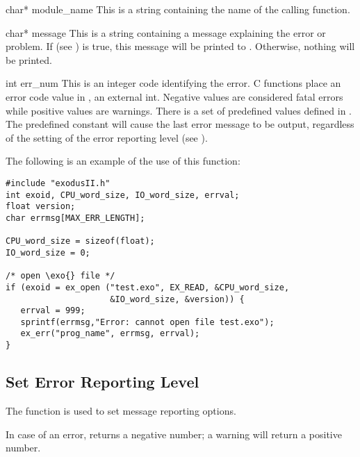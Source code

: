 \begin{parameters}
\item[{char* module_name \R{}}]
{This is a string containing the name of the calling function.}

\item[{char* message \R{}}]
This is a string containing a message explaining the error 
or problem. If  (see ) is true, 
this message will be printed to . Otherwise, 
nothing will be printed.

\item[{int err_num \R{}}]
This is an integer code identifying the error. \exo{} C functions
place an error code value in , an external int. Negative
values are considered fatal errors while positive values are
warnings. There is a set of predefined values defined in
. The predefined constant  will
cause the last error message to be output, regardless of the setting
of the error reporting level (see ).
\end{parameters}

The following is an example of the use of this function:
\begin{lstlisting}
#include "exodusII.h"
int exoid, CPU_word_size, IO_word_size, errval;
float version;
char errmsg[MAX_ERR_LENGTH];

CPU_word_size = sizeof(float); 
IO_word_size = 0;

/* open \exo{} file */
if (exoid = ex_open ("test.exo", EX_READ, &CPU_word_size, 
                     &IO_word_size, &version)) {
   errval = 999;
   sprintf(errmsg,"Error: cannot open file test.exo");
   ex_err("prog_name", errmsg, errval);
}
\end{lstlisting}


\subsection{Set Error Reporting Level}

The function  is used to set message reporting
options.

In case of an error,  returns a negative number; a
warning will return a positive number.



